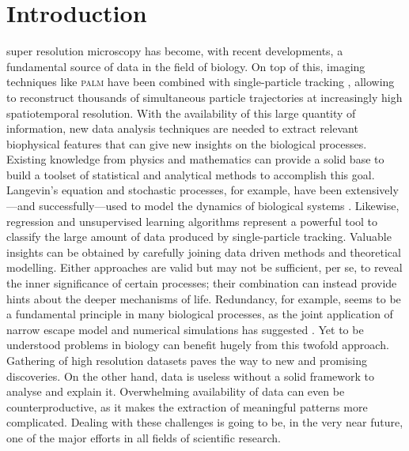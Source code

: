 
\chapter{Introduction}\label{sec:introduction}

super resolution microscopy has become, with recent developments, a fundamental source of data in the field of biology. On top of this, imaging techniques like \textsc{palm} have been combined with single-particle tracking , allowing to reconstruct thousands of simultaneous particle trajectories at increasingly high spatiotemporal resolution. With the availability of this large quantity of information, new data analysis techniques are needed to extract relevant biophysical features that can give new insights on the biological processes. Existing knowledge from physics and mathematics can provide a solid base to build a toolset of statistical and analytical methods to accomplish this goal. Langevin's equation and stochastic processes, for example, have been extensively---and successfully---used to model the dynamics of biological systems . Likewise, regression and unsupervised learning algorithms represent a powerful tool to classify the large amount of data produced by single-particle tracking. Valuable insights can be obtained by carefully joining data driven methods and theoretical modelling. Either approaches are valid but may not be sufficient, per se, to reveal the inner significance of certain processes; their combination can instead provide hints about the deeper mechanisms of life. Redundancy, for example, seems to be a fundamental principle in many biological processes, as the joint application of narrow escape model and numerical simulations has suggested . Yet to be understood problems in biology can benefit hugely from this twofold approach. Gathering of high resolution datasets paves the way to new and promising discoveries. On the other hand, data is useless without a solid framework to analyse and explain it. Overwhelming availability of data can even be counterproductive, as it makes the extraction of meaningful patterns more complicated. Dealing with these challenges is going to be, in the very near future, one of the major efforts in all fields of scientific research.

